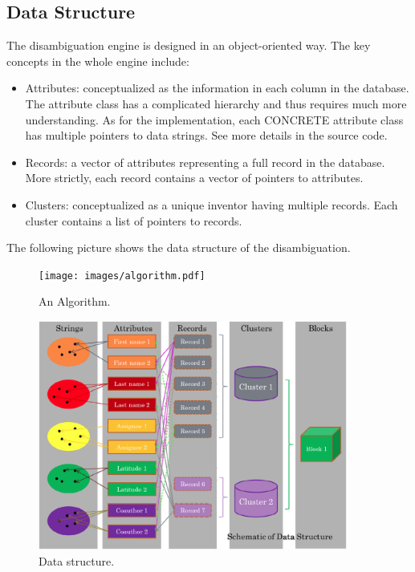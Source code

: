 \documentclass{article}
\begin{document}
\subsection{Data Structure}


The disambiguation engine is designed in an object-oriented 
way. The key concepts in the whole engine include:


\begin{itemize}

\item Attributes: conceptualized as the information in each 
column in the database. The attribute class has a complicated 
hierarchy and thus requires much more understanding. As for the
implementation, each CONCRETE attribute class has multiple 
pointers to data strings. See more details in the source code.

\item Records: a vector of attributes representing a full 
record in the database. More strictly, each
record contains a vector of pointers to attributes.

\item Clusters: conceptualized as a unique inventor having 
multiple records. Each cluster contains a list of
pointers to records.

\end{itemize}


The following picture shows the data structure of the disambiguation.



\begin{figure}
\begin{center}
\texttt{[image: images/algorithm.pdf]}
\caption{An Algorithm.}
\label{fig:algorithm}
\end{center}
\end{figure}


\begin{figure}
\begin{center}
\includegraphics[width=4in]{images/disambiguation_data_structure.png}
\caption{Data structure.}
\label{fig:datastructure}
\end{center}
\end{figure}
\end{document}
